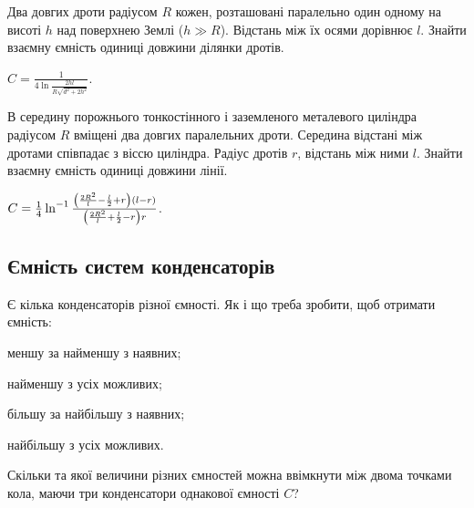 \begin{problem}%
Два довгих дроти радіусом $R$ кожен, розташовані паралельно один одному на висоті $h$ над поверхнею Землі ($h \gg R$). Відстань між їх осями дорівнює $l$. Знайти взаємну ємність одиниці довжини ділянки дротів.
\begin{solution}
	$C = \frac{1}{4\ln\frac{2hl}{R\sqrt{d^2 + 2h^2}}}$.
\end{solution}
\end{problem}

\begin{problem}
В середину порожнього тонкостінного і заземленого металевого циліндра радіусом $R$ вміщені два довгих паралельних дроти. Середина відстані між дротами співпадає з віссю циліндра. Радіус дротів $r$, відстань між ними $l$. Знайти взаємну ємність одиниці довжини лінії.
\begin{solution}
	$C = \frac14\ln^{-1}%
		\frac{%
			\left( \frac{2R^2}{l} - \frac{l}{2} + r \right)(l - r)
		}%
		{\left( \frac{2R^2}{l} + \frac{l}{2} - r \right)r }$.
\end{solution}
\end{problem}

\subsection*{Ємність систем конденсаторів}

\begin{problem}
    Є кілька конденсаторів різної ємності. Як і що треба зробити, щоб отримати ємність:
	\begin{enumerate*}[label=\alph*)]
		\item меншу за найменшу з наявних;
		\item найменшу з усіх можливих;
		\item більшу за найбільшу з наявних;
		\item найбільшу з усіх можливих.
	\end{enumerate*}
\end{problem}

\begin{problem}
    Скільки та якої величини різних ємностей можна ввімкнути між двома точками кола, маючи три конденсатори однакової ємності $C$?
\end{problem}

